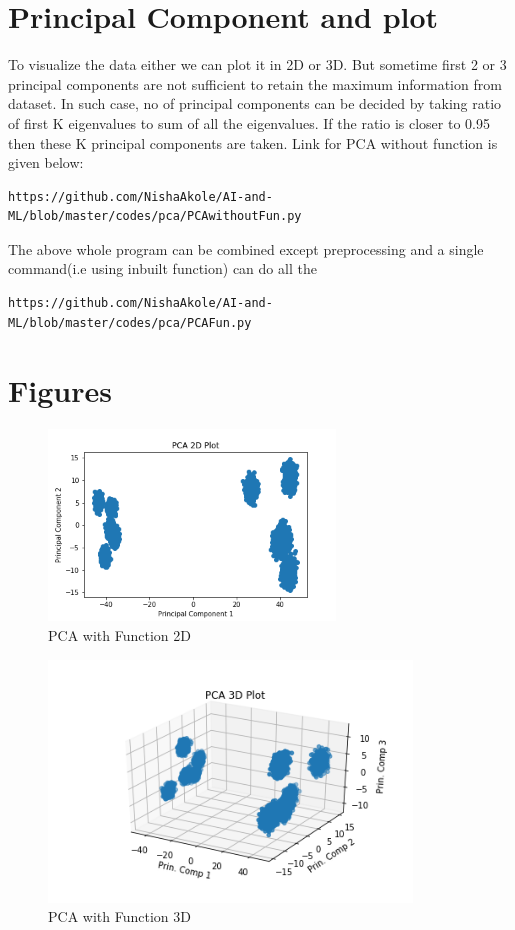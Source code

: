 \documentclass[journal,12pt,twocolumn]{IEEEtran}
\begin{document}
\section{Principal Component and plot}
To visualize the data either we can plot it in 2D or 3D. But sometime first 2 or 3 principal components are not sufficient to retain the maximum information from dataset. In such case, no of principal components can be decided by taking ratio of first K eigenvalues to sum of all the eigenvalues. If the ratio is closer to 0.95 then these K principal components are taken. Link for PCA without function is given below:
\begin{lstlisting}[mathescape=true]
https://github.com/NishaAkole/AI-and-ML/blob/master/codes/pca/PCAwithoutFun.py
\end{lstlisting}
  
The above whole program can be combined except preprocessing and a single command(i.e using inbuilt function) can do all the  
\begin{lstlisting}[mathescape=true]
https://github.com/NishaAkole/AI-and-ML/blob/master/codes/pca/PCAFun.py
\end{lstlisting}

\section{Figures}
\begin{figure}[!h]
\begin{center}
\includegraphics[width=3in]{figs/PCA_2D.png}
\end{center}
\caption{PCA with Function 2D}
\label{fig: 2D Plot}
\end{figure}

\begin{figure}[!h]
\begin{center}
\includegraphics[width=3.8in]{figs/PCA_3D.png}
\end{center}
\caption{PCA with Function 3D}
\label{fig: 3D Plot}
\end{figure}
\end{document}
